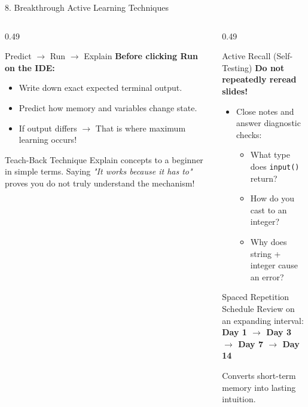 \documentclass[aspectratio=169, 10pt]{beamer}
\begin{document}
\begin{frame}{8. Breakthrough Active Learning Techniques}
  \begin{columns}[T]
    \begin{column}{0.49\textwidth}
      \begin{cbox}[primaryblue]{Predict $\rightarrow$ Run $\rightarrow$ Explain}
        \footnotesize
        \textbf{Before clicking Run on the IDE:}
        \begin{itemize}\setlength{\itemsep}{1.5pt}
          \item Write down exact expected terminal output.
          \item Predict how memory and variables change state.
          \item If output differs $\rightarrow$ That is where maximum learning occurs!
        \end{itemize}
      \end{cbox}
      \vspace{0.06cm}
      \begin{cbox}[secondarygreen]{Teach-Back Technique}
        \footnotesize
        Explain concepts to a beginner in simple terms. Saying \textit{"It works because it has to"} proves you do not truly understand the mechanism!
      \end{cbox}
    \end{column}
    \begin{column}{0.49\textwidth}
      \begin{cbox}[accentorange]{Active Recall (Self-Testing)}
        \footnotesize
        \textbf{Do not repeatedly reread slides!}
        \begin{itemize}\setlength{\itemsep}{1.5pt}
          \item Close notes and answer diagnostic checks:
          \begin{itemize}\scriptsize
            \item What type does \texttt{input()} return?
            \item How do you cast to an integer?
            \item Why does string + integer cause an error?
          \end{itemize}
        \end{itemize}
      \end{cbox}
      \vspace{0.06cm}
      \begin{cbox}[darkgray]{Spaced Repetition Schedule}
        \footnotesize
        Review on an expanding interval:\\
        \centering\textbf{Day 1 $\rightarrow$ Day 3 $\rightarrow$ Day 7 $\rightarrow$ Day 14}\\
        \raggedright Converts short-term memory into lasting intuition.
      \end{cbox}
    \end{column}
  \end{columns}
\end{frame}
\end{document}
